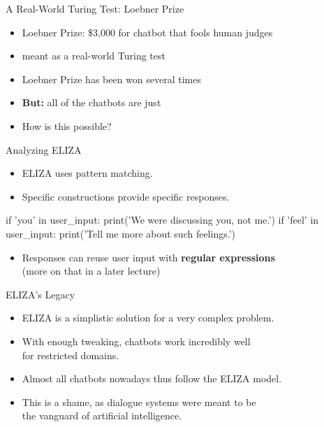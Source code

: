 \documentclass[xcolor={usenames,svgnames,x11names,dvipsnames,table}]{beamer}
\begin{document}
\begin{frame}{A Real-World Turing Test: Loebner Prize}
    \begin{itemize}
        \item Loebner Prize: \$3,000 for chatbot that fools human judges
        \item meant as a real-world Turing test
        \item Loebner Prize has been won several times
        \item \textbf{But:} all of the chatbots are just 
        \item How is this possible?
    \end{itemize}
\end{frame}

\begin{frame}[fragile]{Analyzing ELIZA}
    \begin{itemize}
        \item ELIZA uses pattern matching.
        \item Specific constructions provide specific responses.
    \end{itemize}
    \begin{example}
\begin{pythoncode}
    if 'you' in user_input:
        print('We were discussing you, not me.')
    if 'feel' in user_input:
        print('Tell me more about such feelings.')
\end{pythoncode}
    \end{example}
    \begin{itemize}
        \item Responses can reuse user input with \textbf{regular expressions}\\
              (more on that in a later lecture)
    \end{itemize}
\end{frame}

\begin{frame}{ELIZA's Legacy}
    \begin{itemize}
        \item ELIZA is a simplistic solution for a very complex problem.
        \item With enough tweaking, chatbots work incredibly well\\
            for restricted domains.
        \item Almost all chatbots nowadays thus follow the ELIZA model.
        \item This is a shame, as dialogue systems were meant to be\\
            the vanguard of artificial intelligence.
    \end{itemize}
\end{frame}
\end{document}
